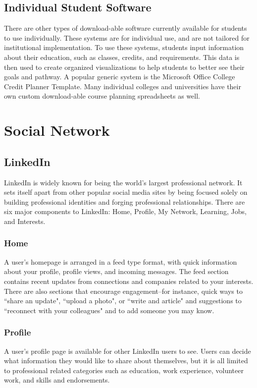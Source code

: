 \subsection{Individual Student Software}
There are other types of download-able software currently available for students to use individually. These systems are for individual use, and are not tailored for institutional implementation. To use these systems, students input information about their education, such as classes, credits, and requirements. This data is then used to create organized visualizations to help students to better see their goals and pathway. A popular generic system is the Microsoft Office College Credit Planner Template. Many individual colleges and universities have their own custom download-able course planning spreadsheets as well.

\section{Social Network}
\subsection{LinkedIn}
LinkedIn is widely known for being the world's largest professional network. It sets itself apart from other popular social media sites by being focused solely on building professional identities and forging professional relationships. There are six major components to LinkedIn: Home, Profile, My Network, Learning, Jobs, and Interests.
\subsubsection{Home}
A user's homepage is arranged in a feed type format, with quick information about your profile, profile views, and incoming messages. The feed section contains recent updates from connections and companies related to your interests. There are also sections that encourage engagement--for instance, quick ways to ``share an update", ``upload a photo", or ``write and article" and suggestions to ``reconnect with your colleagues" and to add someone you may know. 
\subsubsection{Profile}
A user's profile page is available for other LinkedIn users to see. Users can decide what information they would like to share about themselves, but it is all limited to professional related categories such as education, work experience, volunteer work, and skills and endorsements. 
